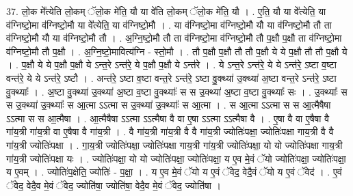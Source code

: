 \documentclass[17pt]{extarticle}
\begin{document}
37. लो॒क मे᳚त्येति लो॒कम् ॅलो॒क मे॑ति॒ यौ या वे॑ति लो॒कम् ॅलो॒क मे॑ति॒ यौ । . ए॒ति॒ यौ या वे᳚त्येति॒ या व॑ग्निष्टो॒मा व॑ग्निष्टो॒मौ या वे᳚त्येति॒ या व॑ग्निष्टो॒मौ । . या व॑ग्निष्टो॒मा व॑ग्निष्टो॒मौ यौ या व॑ग्निष्टो॒मौ तौ ता व॑ग्निष्टो॒मौ यौ या व॑ग्निष्टो॒मौ तौ । . अ॒ग्नि॒ष्टो॒मौ तौ ता व॑ग्निष्टो॒मा व॑ग्निष्टो॒मौ तौ प॒क्षौ प॒क्षौ ता व॑ग्निष्टो॒मा व॑ग्निष्टो॒मौ तौ प॒क्षौ । . अ॒ग्नि॒ष्टो॒मावित्य॑ग्नि - स्तो॒मौ । . तौ प॒क्षौ प॒क्षौ तौ तौ प॒क्षौ ये ये प॒क्षौ तौ तौ प॒क्षौ ये । . प॒क्षौ ये ये प॒क्षौ प॒क्षौ ये ऽन्त॒रे ऽन्त॑रे॒ ये प॒क्षौ प॒क्षौ ये ऽन्त॑रे । . ये ऽन्त॒रे ऽन्त॑रे॒ ये ये ऽन्त॑रे॒ ऽष्टा व॒ष्टा वन्त॑रे॒ ये ये ऽन्त॑रे॒ ऽष्टौ । . अन्त॑रे॒ ऽष्टा व॒ष्टा वन्त॒रे ऽन्त॑रे॒ ऽष्टा वु॒क्थ्या॑ उ॒क्थ्या॑ अ॒ष्टा वन्त॒रे ऽन्त॑रे॒ ऽष्टा वु॒क्थ्याः᳚ । . अ॒ष्टा वु॒क्थ्या॑ उ॒क्थ्या॑ अ॒ष्टा व॒ष्टा वु॒क्थ्याः᳚ स स उ॒क्थ्या॑ अ॒ष्टा व॒ष्टा वु॒क्थ्याः᳚ सः । . उ॒क्थ्याः᳚ स स उ॒क्थ्या॑ उ॒क्थ्याः᳚ स आ॒त्मा ऽऽत्मा स उ॒क्थ्या॑ उ॒क्थ्याः᳚ स आ॒त्मा । . स आ॒त्मा ऽऽत्मा स स आ॒त्मैषैषा ऽऽत्मा स स आ॒त्मैषा । . आ॒त्मैषैषा ऽऽत्मा ऽऽत्मैषा वै वा ए॒षा ऽऽत्मा ऽऽत्मैषा वै । . ए॒षा वै वा ए॒षैषा वै गा॑य॒त्री गा॑य॒त्री वा ए॒षैषा वै गा॑य॒त्री । . वै गा॑य॒त्री गा॑य॒त्री वै वै गा॑य॒त्री ज्योतिः॑पक्षा॒ ज्योतिः॑पक्षा गाय॒त्री वै वै गा॑य॒त्री ज्योतिः॑पक्षा । . गा॒य॒त्री ज्योतिः॑पक्षा॒ ज्योतिः॑पक्षा गाय॒त्री गा॑य॒त्री ज्योतिः॑पक्षा॒ यो यो ज्योतिः॑पक्षा गाय॒त्री गा॑य॒त्री ज्योतिः॑पक्षा यः । . ज्योतिः॑पक्षा॒ यो यो ज्योतिः॑पक्षा॒ ज्योतिः॑पक्षा॒ य ए॒व मे॒वं ॅयो ज्योतिः॑पक्षा॒ ज्योतिः॑पक्षा॒ य ए॒वम् । . ज्योतिः॑प॒क्षेति॒ ज्योतिः॑ - प॒क्षा॒ । . य ए॒व मे॒वं ॅयो य ए॒वं ॅवेद॒ वेदै॒वं ॅयो य ए॒वं ॅवेद॑ । . ए॒वं ॅवेद॒ वेदै॒व मे॒वं ॅवेद॒ ज्योति॑षा॒ ज्योति॑षा॒ वेदै॒व मे॒वं ॅवेद॒ ज्योति॑षा । \newline
\end{document}
